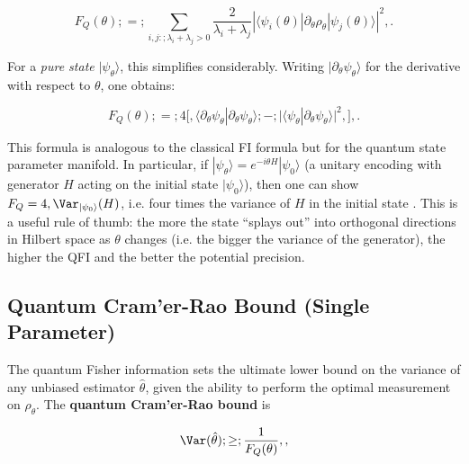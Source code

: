 \begin{equation}

F_Q(\theta) ;=; \sum_{i,j:; \lambda_i + \lambda_j >0} \frac{2}{\lambda_i + \lambda_j} \left|\langle \psi_i(\theta)|\partial_\theta \rho_\theta|\psi_j(\theta)\rangle\right|^2 ,.

\label{eq:QFI-eigen}

\end{equation}

For a \textit{pure state} $|\psi_\theta\rangle$, this simplifies considerably. Writing $|\partial_\theta \psi_\theta\rangle$ for the derivative with respect to $\theta$, one obtains:

\begin{equation}

F_Q(\theta) ;=; 4 \Big[, \langle \partial_\theta \psi_\theta | \partial_\theta \psi_\theta \rangle ;-; \big|\langle \psi_\theta | \partial_\theta \psi_\theta \rangle\big|^2,\Big] ,.

\label{eq:QFI-pure}

\end{equation}

This formula is analogous to the classical FI formula but for the quantum state parameter manifold. In particular, if $|\psi_\theta\rangle = e^{-i\theta H}|\psi_0\rangle$ (a unitary encoding with generator $H$ acting on the initial state $|\psi_0\rangle$), then one can show $F_Q = 4,\Var_{|\psi_0\rangle}(H)$, i.e. four times the variance of $H$ in the initial state \cite{BraunsteinCaves1994, Paris2009}. This is a useful rule of thumb: the more the state “splays out” into orthogonal directions in Hilbert space as $\theta$ changes (i.e. the bigger the variance of the generator), the higher the QFI and the better the potential precision.



\subsection{Quantum Cram'er-Rao Bound (Single Parameter)}



The quantum Fisher information sets the ultimate lower bound on the variance of any unbiased estimator $\hat{\theta}$, given the ability to perform the optimal measurement on $\rho_\theta$. The \textbf{quantum Cram'er-Rao bound} is

\begin{equation}

\Var(\hat{\theta}) ;\ge; \frac{1}{F_Q(\theta)} ,,

\label{eq:QCRB}

\end{equation}

